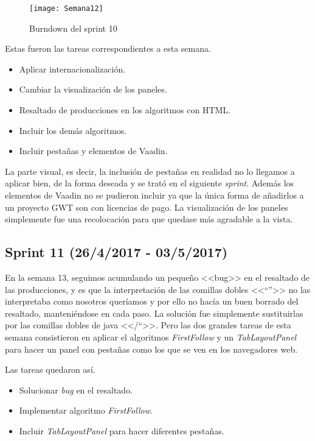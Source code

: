 \begin{figure}[h]
\centering
\texttt{[image: Semana12]}
\caption{Burndown del sprint 10}
\label{fig:A.9}
\end{figure}

Estas fueron las tareas correspondientes a esta semana.

\begin{itemize}
\item Aplicar internacionalización.
\item Cambiar la visualización de los paneles.
\item Resaltado de producciones en los algoritmos con HTML.
\item Incluir los demás algoritmos.
\item Incluir pestañas y elementos de Vaadin.
\end{itemize}

La parte visual, es decir, la inclusión de pestañas en realidad no lo llegamos a aplicar bien, de la forma deseada y se trató en el siguiente \emph{sprint}. Además los elementos de Vaadin no se pudieron incluir ya que la única forma de añadirlos a un proyecto GWT son con licencias de pago. La visualización de los paneles simplemente fue una recolocación para que quedase más agradable a la vista.


\subsection{Sprint 11 (26/4/2017 - 03/5/2017)}

En la semana 13, seguimos acumulando un pequeño <<bug>> en el resaltado de las producciones, y es que la interpretación de las comillas dobles <<``''>> no las interpretaba como nosotros queríamos y por ello no hacía un buen borrado del resaltado, manteniéndose en cada paso. La solución fue simplemente sustituirlas por las comillas dobles de java <</``>>. Pero las dos grandes tareas de esta semana consistieron en aplicar el algoritmos \emph{FirstFollow} y un \emph{TabLayoutPanel} para hacer un panel con pestañas como los que se ven en los navegadores web.

Las tareas quedaron así.

\begin{itemize}
\item Solucionar \emph{bug} en el resaltado.
\item Implementar algoritmo \emph{FirstFollow}.
\item Incluir \emph{TabLayoutPanel} para hacer diferentes pestañas.
\end{itemize}

